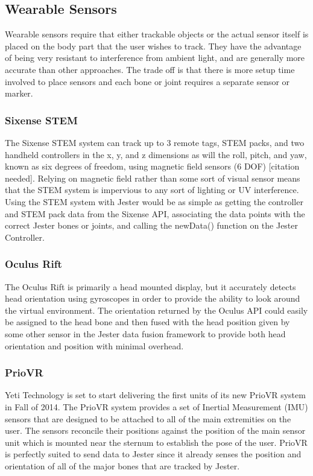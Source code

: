 \subsection{Wearable Sensors}

Wearable sensors require that either trackable objects or the actual sensor itself is placed on the body part that the user wishes to track. They have the advantage of being very resistant to interference from ambient light, and are generally more accurate than other approaches. The trade off is that there is more setup time involved to place sensors and each bone or joint requires a separate sensor or marker.

\subsubsection{Sixense STEM}

The Sixense STEM system can track up to 3 remote tags, STEM packs, and two handheld controllers in the x, y, and z dimensions as will the roll, pitch, and yaw, known as six degrees of freedom, using magnetic field sensors (6 DOF) [citation needed]. Relying on magnetic field rather than some sort of visual sensor means that the STEM system is impervious to any sort of lighting or UV interference. Using the STEM system with Jester would be as simple as getting the controller and STEM pack data from the Sixense API, associating the data points with the correct Jester bones or joints, and calling the newData() function on the Jester Controller.

\subsubsection{Oculus Rift}

The Oculus Rift is primarily a head mounted display, but it accurately detects head orientation using gyroscopes in order to provide the ability to look around the virtual environment. The orientation returned by the Oculus API could easily be assigned to the head bone and then fused with the head position given by some other sensor in the Jester data fusion framework to provide both head orientation and position with minimal overhead.

\subsubsection{PrioVR}

Yeti Technology is set to start delivering the first units of its new PrioVR system in Fall of 2014. The PrioVR system provides a set of Inertial Measurement (IMU) sensors that are designed to be attached to all of the main extremities on the user. The sensors reconcile their positions against the position of the main sensor unit which is mounted near the sternum to establish the pose of the user. PrioVR is perfectly suited to send data to Jester since it already senses the position and orientation of all of the major bones that are tracked by Jester.

